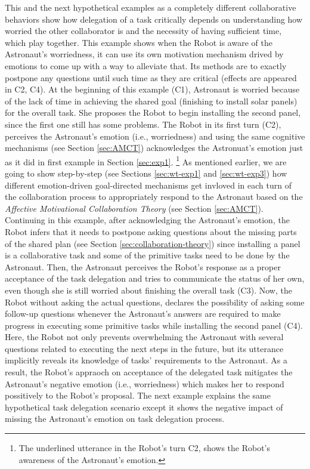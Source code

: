 This and the next hypothetical examples as a completely different collaborative
behaviors show how delegation of a task critically depends on understanding how
worried the other collaborator is and the necessity of having sufficient time,
which play together. This example shows when the Robot is aware of the
Astronaut's worriedness, it can use its own motivation mechanism drived by
emotions to come up with a way to alleviate that. Its methods are to exactly
postpone any questions until such time as they are critical (effects are
appeared in C2, C4). At the beginning of this example (C1), Astronaut is worried
because of the lack of time in achieving the shared goal (finishing to install
solar panels) for the overall task. She proposes the Robot to begin installing
the second panel, since the first one still has some problems. The Robot in its
first turn (C2), perceives the Astronaut's emotion (i.e., worriedness) and using
the same cognitive mechanisms (see Section \ref{sec:AMCT}) acknowledges the
Astronuat's emotion just as it did in first example in Section \ref{sec:exp1}.
\footnote{The underlined utterance in the Robot's turn C2, shows the Robot's
awareness of the Astronaut's emotion.} As mentioned earlier, we are going to
show step-by-step (see Sections \ref{sec:wt-exp1} and \ref{sec:wt-exp3}) how
different emotion-driven goal-directed mechanisms get invloved in each turn of
the collaboration process to appropriately respond to the Astronaut based on the
\textit{Affective Motivational Collaboration Theory} (see Section
\ref{sec:AMCT}). Continuing in this example, after acknowledging the Astronaut's
emotion, the Robot infers that it needs to postpone asking questions about the
missing parts of the shared plan (see Section \ref{sec:collaboration-theory})
since installing a panel is a collaborative task and some of the primitive tasks
need to be done by the Astronaut. Then, the Astronaut perceives the Robot's
response as a proper acceptance of the task delegation and tries to communicate
the status of her own, even though she is still worried about finishing the
overall task (C3). Now, the Robot without asking the actual questions, declares
the possibility of asking some follow-up questions whenever the Astronaut's
answers are required to make progress in executing some primitive tasks while
installing the second panel (C4). Here, the Robot not only prevents overwhelming
the Astronaut with several questions related to executing the next steps in the
future, but its utterance implicitly reveals its knowledge of tasks'
requirements to the Astronaut. As a result, the Robot's appraoch on acceptance
of the delegated task mitigates the Astronaut's negative emotion (i.e.,
worriedness) which makes her to respond possitively to the Robot's proposal. The
next example explains the same hypothetical task delegation scenario except it
shows the negative impact of missing the Astronaut's emotion on task delegation
process.\\


